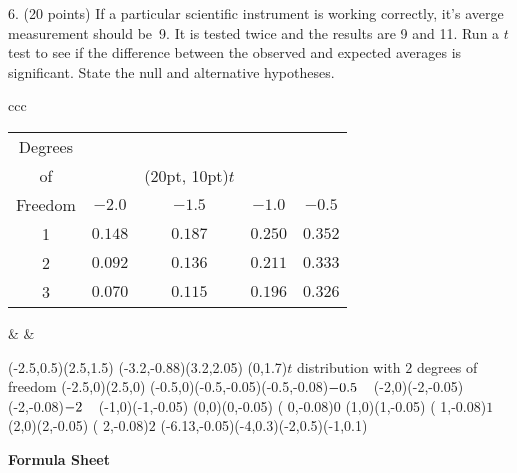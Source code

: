 \documentclass[10pt]{article}
\begin{document}
\vfill
\eject

6. (20 points) If a  particular scientific instrument is working correctly, it's averge measurement
should be~9.  It is tested twice and the results are 9 and 11.  Run a $t$ test to see if the
difference between the observed and expected averages is significant.  State the null and alternative hypotheses.


\vfill
\begin{tabular}{ccc}
\begin{tabular}{|c|cccc|}\hline
Degrees\vphantom{\LARGE Y} & &&&\\
of      & &\rput(20pt, 10pt){$t$}&&\\
Freedom & $-2.0$ & $-1.5$ & $-1.0$ & $-0.5$\\[3pt]\hline
1       & $0.148$ & $0.187$ & $0.250$ & $0.352$\vphantom{\LARGE Y}\\
2       & $0.092$ & $0.136$ & $0.211$ & $0.333$\\
3       & $0.070$ & $0.115$ & $0.196$ & $0.326$\\\hline
\end{tabular}
&\hspace{1in} &
\begin{pspicture}(-2.5,0.5)(2.5,1.5)
\psframe[linewidth=0.02](-3.2,-0.88)(3.2,2.05)
\rput(0,1.7){$t$ distribution with $2$ degrees of freedom}
\psline{<->}(-2.5,0)(2.5,0)
\psline(-0.5,0)(-0.5,-0.05)\rput[t](-0.5,-0.08){\footnotesize$-0.5\hphantom{-}$}
\psline(-2,0)(-2,-0.05)    \rput[t](-2,-0.08){\footnotesize$-2\hphantom{-}$}
\psline(-1,0)(-1,-0.05)   %
\psline(0,0)(0,-0.05)      \rput[t]( 0,-0.08){\footnotesize$0$}
\psline(1,0)(1,-0.05)      \rput[t]( 1,-0.08){\footnotesize$1$}
\psline(2,0)(2,-0.05)      \rput[t]( 2,-0.08){\footnotesize$2$}
\psbezier{->}(-6.13,-0.05)(-4,0.3)(-2,0.5)(-1,0.1)
\end{pspicture}
\end{tabular}

\eject

\begin{center}
\textbf{\large Formula Sheet}
\end{center}
\end{document}
